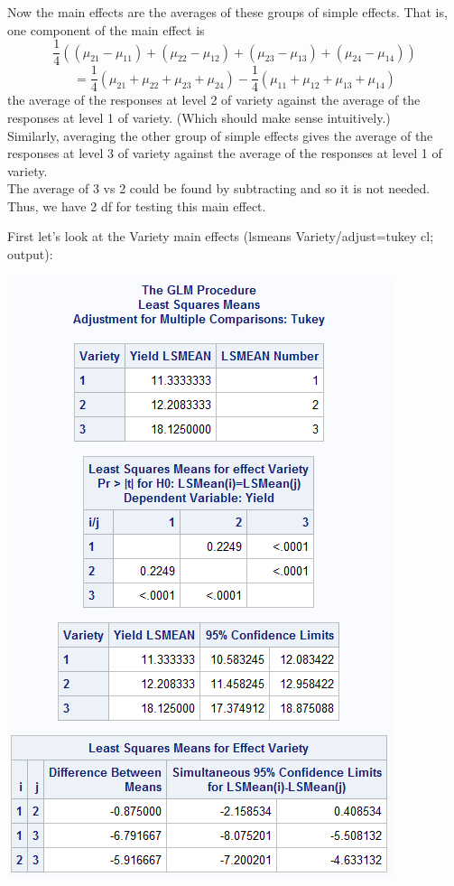 Now the main effects are the averages of these groups of simple effects.  That is, one component of the main effect is
$$\frac{1}{4}\left((\mu_{21}-\mu_{11})+(\mu_{22}-\mu_{12})+(\mu_{23}-\mu_{13})+(\mu_{24}-\mu_{14})\right)$$
$$= \frac{1}{4}\left(\mu_{21}+\mu_{22}+\mu_{23}+\mu_{24}\right)-\frac{1}{4}\left(\mu_{11}+\mu_{12}+\mu_{13}+\mu_{14}\right)$$
the average of the responses at level 2 of variety against the average of the responses at level 1 of variety.  (Which should make sense intuitively.)\\

Similarly, averaging the other group of simple effects gives the average of the responses at level 3 of variety against the average of the responses at level 1 of variety.\\

The average of 3 vs 2 could be found by subtracting and so it is not needed.  Thus, we have 2 df for testing this main effect.
\newpage

First let's look at the Variety main effects (lsmeans Variety/adjust=tukey cl; output):
\begin{flushleft}
\includegraphics[scale=0.7]{Tomato3}
\end{flushleft}



